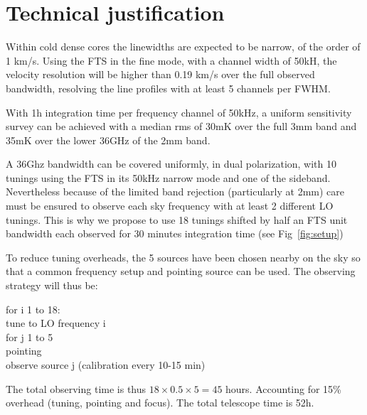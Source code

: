 \section{Technical justification}
 Within cold dense cores the linewidths are expected to be narrow, of the order of 1 km/s. Using the FTS in the fine mode, with a channel width of 50kH, the velocity resolution will be higher than 0.19 km/s over the full observed bandwidth, resolving the line profiles with at least 5 channels per FWHM.

With 1h integration time per frequency channel of 50kHz, a uniform sensitivity survey can be achieved with a median rms of 30mK over the full 3mm band and 35mK over the lower 36GHz of the 2mm band. 

A 36Ghz bandwidth can be covered uniformly, in dual polarization, with 10 tunings using the FTS in its 50kHz narrow mode and one of the sideband. Nevertheless because of the limited band rejection (particularly at 2mm) care must be ensured to observe each sky frequency with at least 2 different LO tunings. This is why we propose to use 18 tunings shifted by half an FTS unit bandwidth each observed for 30 minutes integration time (see Fig~\ref{fig:setup})

To reduce tuning overheads, the 5 sources have been chosen nearby on the sky so that a common frequency setup and pointing source can be used. The observing strategy will thus be: 

for i 1 to 18:\\
\indent  tune to LO frequency i\\
  for j 1 to 5\\
    pointing\\
    observe source j (calibration every 10-15 min)

The total observing time is thus $18\times0.5\times5=45$ hours. Accounting for 15\% overhead (tuning, pointing and focus). The total telescope time is 52h.
   
  
  
  
  
  
  
  
  